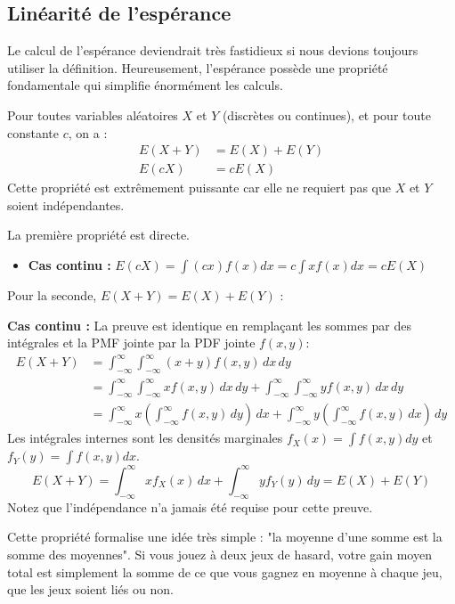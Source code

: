 \subsection{Linéarité de l'espérance}

Le calcul de l'espérance deviendrait très fastidieux si nous devions toujours utiliser la définition. Heureusement, l'espérance possède une propriété fondamentale qui simplifie énormément les calculs.

\begin{theorembox}
Pour toutes variables aléatoires $X$ et $Y$ (discrètes ou continues), et pour toute constante $c$, on a :
\begin{align*}
E(X+Y) &= E(X) + E(Y) \\
E(cX) &= cE(X)
\end{align*}
Cette propriété est extrêmement puissante car elle ne requiert pas que $X$ et $Y$ soient indépendantes.
\end{theorembox}

\begin{proofbox}
La première propriété est directe.
\begin{itemize}
    \item \textbf{Cas continu :} $E(cX) = \int (cx) f(x) dx = c \int x f(x) dx = cE(X)$
\end{itemize}
Pour la seconde, $E(X+Y) = E(X) + E(Y)$ :

\textbf{Cas continu :} La preuve est identique en remplaçant les sommes par des intégrales et la PMF jointe par la PDF jointe $f(x, y)$:
\begin{align*}
E(X+Y) &= \int_{-\infty}^{\infty} \int_{-\infty}^{\infty} (x+y) f(x, y) \, dx \, dy \\
&= \int_{-\infty}^{\infty} \int_{-\infty}^{\infty} x f(x, y) \, dx \, dy + \int_{-\infty}^{\infty} \int_{-\infty}^{\infty} y f(x, y) \, dx \, dy \\
&= \int_{-\infty}^{\infty} x \left( \int_{-\infty}^{\infty} f(x, y) \, dy \right) \, dx + \int_{-\infty}^{\infty} y \left( \int_{-\infty}^{\infty} f(x, y) \, dx \right) \, dy
\end{align*}
Les intégrales internes sont les densités marginales $f_X(x) = \int f(x, y) dy$ et $f_Y(y) = \int f(x, y) dx$.
$$E(X+Y) = \int_{-\infty}^{\infty} x f_X(x) \, dx + \int_{-\infty}^{\infty} y f_Y(y) \, dy = E(X) + E(Y)$$
Notez que l'indépendance n'a jamais été requise pour cette preuve.
\end{proofbox}

\begin{intuitionbox}
Cette propriété formalise une idée très simple : "la moyenne d'une somme est la somme des moyennes". Si vous jouez à deux jeux de hasard, votre gain moyen total est simplement la somme de ce que vous gagnez en moyenne à chaque jeu, que les jeux soient liés ou non.
\end{intuitionbox}

